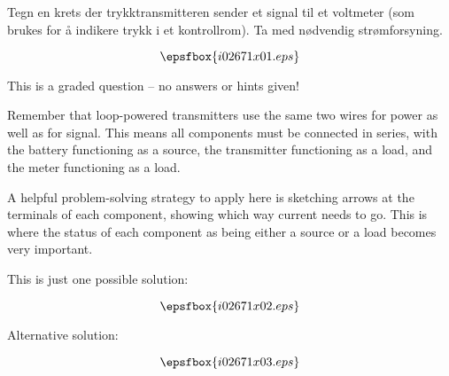 

Tegn en krets der trykktransmitteren sender et signal til et voltmeter (som brukes for {\aa} indikere trykk i et kontrollrom). Ta med n{\o}dvendig str{\o}mforsyning.


\vskip 50pt

$$\epsfbox{i02671x01.eps}$$

\vfil 

\eject






This is a graded question -- no answers or hints given!







Remember that loop-powered transmitters use the same two wires for power as well as for signal.  This means all components must be connected in series, with the battery functioning as a source, the transmitter functioning as a load, and the meter functioning as a load.

\vskip 10pt

A helpful problem-solving strategy to apply here is sketching arrows at the terminals of each component, showing which way current needs to go.  This is where the status of each component as being either a source or a load becomes very important.

\vskip 10pt

This is just one possible solution:

$$\epsfbox{i02671x02.eps}$$

\vskip 10pt

Alternative solution:

$$\epsfbox{i02671x03.eps}$$




